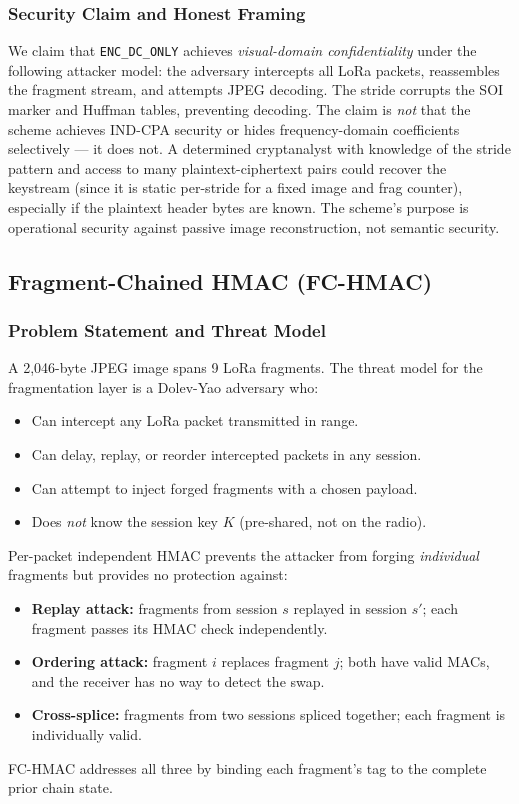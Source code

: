 \documentclass[journal]{IEEEtran}
\begin{document}
\subsubsection{Security Claim and Honest Framing}

We claim that \texttt{ENC\_DC\_ONLY} achieves \emph{visual-domain
confidentiality} under the following attacker model: the adversary intercepts
all LoRa packets, reassembles the fragment stream, and attempts JPEG decoding.
The stride corrupts the SOI marker and Huffman tables, preventing decoding.
The claim is \emph{not} that the scheme achieves IND-CPA security or hides
frequency-domain coefficients selectively --- it does not.  A determined
cryptanalyst with knowledge of the stride pattern and access to many
plaintext-ciphertext pairs could recover the keystream (since it is static
per-stride for a fixed image and frag counter), especially if the plaintext
header bytes are known.  The scheme's purpose is operational security against
passive image reconstruction, not semantic security.

\subsection{Fragment-Chained HMAC (FC-HMAC)}
\label{sec:fc_hmac}

\subsubsection{Problem Statement and Threat Model}

A 2{,}046-byte JPEG image spans 9 LoRa fragments.  The threat model for the
fragmentation layer is a Dolev-Yao adversary \cite{tamarin_prover} who:
\begin{itemize}
  \item Can intercept any LoRa packet transmitted in range.
  \item Can delay, replay, or reorder intercepted packets in any session.
  \item Can attempt to inject forged fragments with a chosen payload.
  \item Does \emph{not} know the session key $K$ (pre-shared, not on the radio).
\end{itemize}

Per-packet independent HMAC prevents the attacker from forging
\emph{individual} fragments but provides no protection against:
\begin{itemize}
  \item \textbf{Replay attack:} fragments from session $s$ replayed in session $s'$;
    each fragment passes its HMAC check independently.
  \item \textbf{Ordering attack:} fragment $i$ replaces fragment $j$; both have
    valid MACs, and the receiver has no way to detect the swap.
  \item \textbf{Cross-splice:} fragments from two sessions spliced together;
    each fragment is individually valid.
\end{itemize}
FC-HMAC addresses all three by binding each fragment's tag to the complete
prior chain state.
\end{document}
